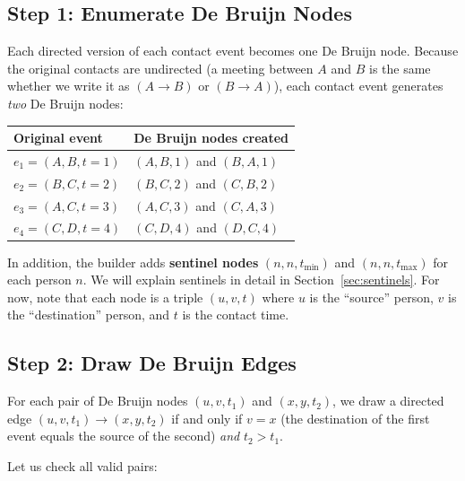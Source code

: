\subsection{Step 1: Enumerate De Bruijn Nodes}

Each directed version of each contact event becomes one De Bruijn node. Because the original
contacts are undirected (a meeting between $A$ and $B$ is the same whether we write it as
$(A \to B)$ or $(B \to A)$), each contact event generates \emph{two} De Bruijn nodes:

\begin{center}
\begin{tabular}{ll}
\toprule
\textbf{Original event} & \textbf{De Bruijn nodes created} \\
\midrule
$e_1 = (A, B, t=1)$ & $(A, B, 1)$ and $(B, A, 1)$ \\
$e_2 = (B, C, t=2)$ & $(B, C, 2)$ and $(C, B, 2)$ \\
$e_3 = (A, C, t=3)$ & $(A, C, 3)$ and $(C, A, 3)$ \\
$e_4 = (C, D, t=4)$ & $(C, D, 4)$ and $(D, C, 4)$ \\
\bottomrule
\end{tabular}
\end{center}

In addition, the builder adds \textbf{sentinel nodes} $(n, n, t_{\min})$ and
$(n, n, t_{\max})$ for each person $n$. We will explain sentinels in detail in
Section~\ref{sec:sentinels}. For now, note that each node is a triple $(u, v, t)$ where $u$
is the ``source'' person, $v$ is the ``destination'' person, and $t$ is the contact time.

\subsection{Step 2: Draw De Bruijn Edges}

For each pair of De Bruijn nodes $(u, v, t_1)$ and $(x, y, t_2)$, we draw a directed edge
$(u, v, t_1) \to (x, y, t_2)$ if and only if $v = x$ (the destination of the first event
equals the source of the second) \emph{and} $t_2 > t_1$.

Let us check all valid pairs:

